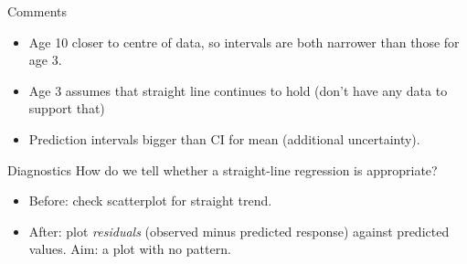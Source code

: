 \documentclass{beamer}
\begin{document}
\begin{frame}[fragile]{Comments}

\begin{itemize}
\item Age 10 closer to centre of data, so intervals are both narrower than those for age 3.
\item Age 3 assumes that straight line continues to hold (don't have any data to support that)
\item Prediction intervals bigger than CI for mean (additional uncertainty).
\end{itemize}

\end{frame}

\begin{frame}[fragile]{Diagnostics}
How do we tell whether a straight-line regression is appropriate?

\vspace{3ex}

\begin{itemize}
\item Before: check scatterplot for straight trend.
\item After: plot {\em residuals} (observed minus predicted response) against predicted values. Aim: a plot with no pattern.
\end{itemize}

\vspace{3ex}


\end{frame}
\end{document}
